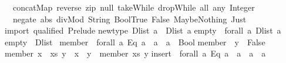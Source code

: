 \begin{isabellebody}
\begin{isamarkuptext}
\ \ concatMap{}\ reverse{}\ zip{}\ null{}\ takeWhile{}\ dropWhile{}\ all{}\ any{}\ Integer{}\isanewline
\ \ negate{}\ abs{}\ divMod{}\ String{}\ Bool{}True{}\ False{}{}\ Maybe{}Nothing{}\ Just{}{}{}\isanewline
import\ qualified\ Prelude{}\isanewline
\isanewline
newtype\ Dlist\ a\ {}\ Dlist\ {}a{}{}\isanewline
\isanewline
empty\ {}{}\ forall\ a{}\ Dlist\ a{}\isanewline
empty\ {}\ Dlist\ {}{}{}\isanewline
\isanewline
member\ {}{}\ forall\ a{}\ {}Eq\ a{}\ {}{}\ {}a{}\ {}{}\ a\ {}{}\ Bool{}\isanewline
member\ {}{}\ y\ {}\ False{}\isanewline
member\ {}x\ {}\ xs{}\ y\ {}\ x\ {}{}\ y\ {}{}\ member\ xs\ y{}\isanewline
\isanewline
insert\ {}{}\ forall\ a{}\ {}Eq\ a{}\ {}{}\ a\ {}{}\ {}a{}\ {}{}\ {}a{}{}\isanewline

\end{isamarkuptext}
\end{isabellebody}
